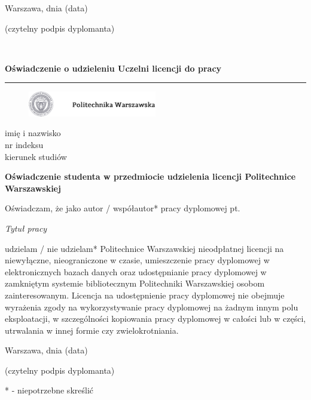 \vspace{3cm}

\begin{multicols}{2}
	\begin{flushleft}
		Warszawa, dnia (data)
	\end{flushleft}
	\begin{flushright}
		(czytelny podpis dyplomanta)
	\end{flushright}
\end{multicols}

\newpage
\mbox{ }

\newpage
{\large \textbf{Oświadczenie o udzieleniu Uczelni licencji do pracy}}\\
{\color{sliwka}\rule[1pt]{\textwidth}{1.5pt}}

\vspace{0.6cm}

\begin{figure}[h]
	\includegraphics[width=0.5\textwidth]{img/pw_logo_tekst.png}
\end{figure}

\vspace{0.6cm}
{\large imię i nazwisko}\\
nr indeksu\\
kierunek studiów\\

\begin{center}
	{\large \textbf{Oświadczenie studenta w przedmiocie udzielenia licencji Politechnice Warszawskiej}}
\end{center}


Oświadczam, że jako autor / współautor* pracy dyplomowej pt.
\begin{center}
\textit{Tytuł pracy}
\end{center}
udzielam / nie udzielam* Politechnice Warszawskiej nieodpłatnej licencji na niewyłączne, nieograniczone w czasie, umieszczenie pracy dyplomowej w elektronicznych bazach danych oraz udostępnianie pracy dyplomowej w zamkniętym systemie bibliotecznym Politechniki Warszawskiej osobom zainteresowanym.
Licencja na udostępnienie pracy dyplomowej nie obejmuje wyrażenia zgody na wykorzystywanie pracy dyplomowej na żadnym innym polu eksploatacji, w szczególności kopiowania pracy dyplomowej w całości lub w części, utrwalania w innej formie czy zwielokrotniania.

\vspace{3cm}

\begin{multicols}{2}
	\begin{flushleft}
		Warszawa, dnia (data)
	\end{flushleft}
	\begin{flushright}
		(czytelny podpis dyplomanta)
	\end{flushright}
\end{multicols}
* - niepotrzebne skreślić

\newpage
\mbox{ }

